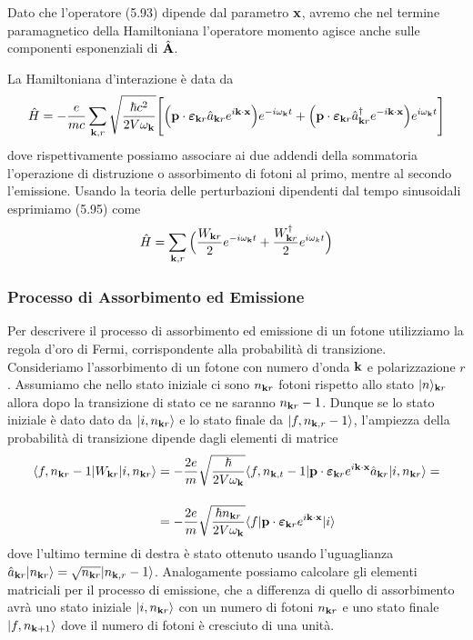 Dato che l'operatore (5.93) dipende dal parametro $\bold{x}$, avremo che nel termine paramagnetico della Hamiltoniana l'operatore momento agisce anche sulle componenti esponenziali di $\hat{\bold{A}}$.

La Hamiltoniana d'interazione \`e data da
\begin{equation}
	\hat{H} = - \frac{e}{mc} \sum_{\bold{k},r} \sqrt{\frac{\hbar c^2}{2V\omega_{\bold{k}}}}\Bigg[\Big(\bold{p} \cdot \boldsymbol{\varepsilon}_{\bold{k}r}\hat{a}_{\bold{k}r}e^{i \bold{k}\cdot \bold{x}}\Big)e^{-i\omega_{\bold{k}}t}+\Big(\bold{p} \cdot \boldsymbol{\varepsilon}_{\bold{k}r}\hat{a}_{\bold{k}r}^{\dag}e^{-i\bold{k} \cdot \bold{x}}\Big)e^{i \omega_{\bold{k}}t} \Bigg ]
\end{equation} 
dove rispettivamente possiamo associare ai due addendi della sommatoria l'operazione di distruzione o assorbimento di fotoni al primo, mentre al secondo l'emissione.
Usando la teoria delle perturbazioni dipendenti dal tempo sinusoidali esprimiamo (5.95) come
\begin{equation}
	\hat{H} = \sum_{\bold{k},r} \Big( \frac{W_{\bold{k}r}}{2}e^{-i\omega_{\bold{k}}t} + \frac{W_{\bold{k}r}^\dag}{2}e^{i \omega_{k}t} \Big)
\end{equation}

\newpage
\subsubsection{Processo di Assorbimento ed Emissione}
Per descrivere il processo di assorbimento ed emissione di un fotone utilizziamo la regola d'oro di Fermi, corrispondente alla probabilit\`a di transizione.
 Consideriamo l'assorbimento di un fotone con numero d'onda $\bold{k}$ e polarizzazione $r$. Assumiamo che nello stato iniziale ci sono $n_{\bold{k}r}$ fotoni  rispetto allo stato $|n \rangle_{\bold{k}r}$ allora dopo la transizione di stato ce ne saranno $n_{\bold{k}r}-1$. Dunque se lo stato iniziale \`e dato dato da $|i,n_{\bold{k}r} \rangle$ e lo stato finale da $|f,n_{\bold{k},r}-1\rangle$, l'ampiezza della probabilit\`a di transizione dipende dagli elementi di matrice 
\begin{align*}
	\langle f,n_{\bold{k}r}-1| W_{\bold{k}r} |i,n_{\bold{k}r}\rangle & = - \frac{2e}{m}\sqrt{\frac{\hbar}{2V\omega_\bold{k}}}\langle f,n_{\bold{k},t}-1|\bold{p} \cdot \boldsymbol{\varepsilon}_{\bold{k}r}e^{i \bold{k}\cdot \bold{x}}\hat{a}_{\bold{k}r}|i,n_{\bold{k}r} \rangle = \\[0.4cm] 
	& = - \frac{2e}{m}\sqrt{\frac{\hbar n_{\bold{k}r}}{2V\omega_\bold{k}}}\langle f|\bold{p} \cdot \boldsymbol{\varepsilon}_{\bold{k}r}e^{i \bold{k}\cdot \bold{x}}|i \rangle
\end{align*}
dove l'ultimo termine di destra \`e stato ottenuto usando l'uguaglianza $\hat{a}_{\bold{k}r}|n_{\bold{k}r}\rangle = \sqrt{n_{\bold{k}r}}|n_{\bold{k},r}-1\rangle $. Analogamente possiamo calcolare gli elementi matriciali per il processo di emissione, che a differenza di quello di assorbimento avr\`a uno stato iniziale $|i,n_{\bold{k}r} \rangle$ con un numero di fotoni $n_{\bold{k}r}$ e uno stato finale $|f,n_{\bold{k}+1 }\rangle$  dove il numero di fotoni \`e cresciuto di una unit\`a.
